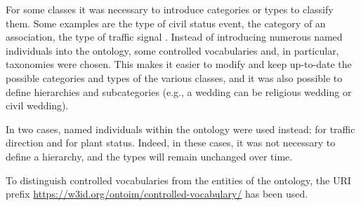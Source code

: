 For some classes it was necessary to introduce categories or types to classify them. Some examples are the type of civil status event, the category of an association, the type of traffic signal \etc. Instead of introducing numerous named individuals into the ontology, some controlled vocabularies and, in particular, taxonomies were chosen. This makes it easier to modify and keep up-to-date the possible categories and types of the various classes, and it was also possible to define hierarchies and subcategories (e.g., a wedding can be religious wedding or civil wedding).

In two cases, named individuals within the ontology were used instead: for traffic direction and for plant status. Indeed, in these cases, it was not necessary to define a hierarchy, and the types will remain unchanged over time.

To distinguish controlled vocabularies from the entities of the ontology, the \ac{URI} prefix \url{https://w3id.org/ontoim/controlled-vocabulary/} has been used.